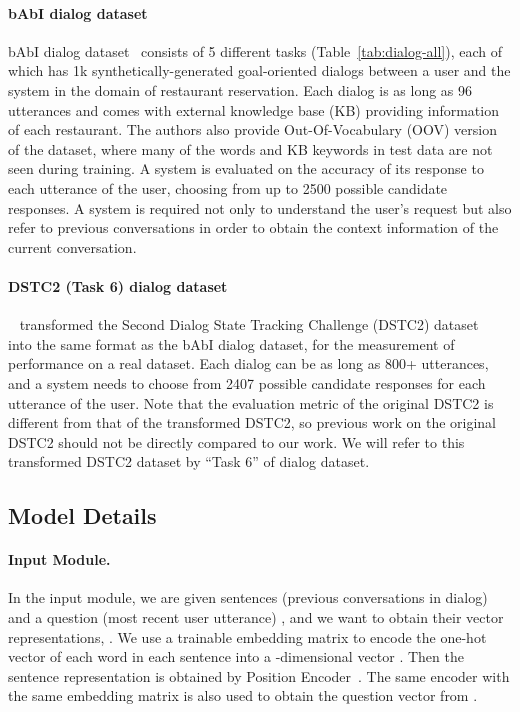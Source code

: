 \documentclass[table]{article}
\begin{document}
\paragraph{bAbI dialog dataset}
bAbI dialog dataset~\citep{bordes2016learning} consists of 5 different tasks (Table~\ref{tab:dialog-all}), each of which has 1k synthetically-generated goal-oriented dialogs between a user and the system in the domain of restaurant reservation. 
Each dialog is as long as 96 utterances and comes with external knowledge base (KB) providing information of each restaurant.
The authors also provide Out-Of-Vocabulary (OOV) version of the dataset, where many of the words and KB keywords in test data are not seen during training.
A system is evaluated on the accuracy of its response to each utterance of the user, choosing from up to 2500 possible candidate responses.
A system is required not only to understand the user's request but also refer to previous conversations in order to obtain the context information of the current conversation.




\paragraph{DSTC2 (Task 6) dialog dataset} 
~\cite{bordes2016learning} transformed the Second Dialog State Tracking Challenge (DSTC2) dataset~\citep{henderson2014second} into the same format as the bAbI dialog dataset, for the measurement of performance on a real dataset.
Each dialog can be as long as 800+ utterances, and a system needs to choose from 2407 possible candidate responses for each utterance of the user.
Note that the evaluation metric of the original DSTC2 is different from that of the transformed DSTC2, so previous work on the original DSTC2 should not be directly compared to our work.
We will refer to this transformed DSTC2 dataset by ``Task 6'' of dialog dataset.



\subsection{Model Details}

\paragraph{Input Module.} In the input module, we are given sentences (previous conversations in dialog)  and a question (most recent user utterance) , and we want to obtain their vector representations, .
We use a trainable embedding matrix  to encode the one-hot vector of each word  in each sentence  into a -dimensional vector .
Then the sentence representation  is obtained by Position Encoder~\citep{memNet}. The same encoder with the same embedding matrix is also used to obtain the question vector  from .
\end{document}
